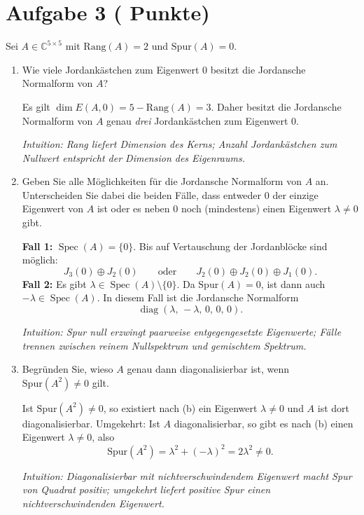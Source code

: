\documentclass[11pt, a4paper]{article}
\newcommand{\aufgabe}[2]{%
  \section*{\Large\bfseries Aufgabe #1%
  \if\relax\detokenize{#2}\relax\else \hfill\normalfont\normalsize(#2 Punkte)\fi}%
  \vspace{-1.5ex}
}
\begin{document}
\aufgabe{3}{}
Sei $A\in\mathbb{C}^{5\times 5}$ mit $\mathrm{Rang}(A)=2$ und $\mathrm{Spur}(A)=0$.
\begin{enumerate}
  \item Wie viele Jordankästchen zum Eigenwert $0$ besitzt die Jordansche Normalform von $A$?
  \begin{framed}
  Es gilt $\dim E(A,0)=5-\mathrm{Rang}(A)=3$. Daher besitzt die Jordansche
  Normalform von $A$ genau \emph{drei} Jordankästchen zum Eigenwert $0$.

  \medskip\noindent\textit{Intuition: Rang liefert Dimension des Kerns; Anzahl Jordankästchen zum Nullwert entspricht der Dimension des Eigenraums.}
  \end{framed}

  \item Geben Sie alle Möglichkeiten für die Jordansche Normalform von $A$ an. Unterscheiden Sie dabei die beiden Fälle, dass entweder $0$ der einzige Eigenwert von $A$ ist oder es neben $0$ noch (mindestens) einen Eigenwert $\lambda\neq 0$ gibt.
  \begin{framed}
  \textbf{Fall 1:} $\operatorname{Spec}(A)=\{0\}$. Bis auf Vertauschung der
  Jordanblöcke sind möglich:
  \[
    J_3(0)\oplus J_2(0)
    \qquad\text{oder}\qquad
    J_2(0)\oplus J_2(0)\oplus J_1(0).
  \]
  \textbf{Fall 2:} Es gibt $\lambda\in\operatorname{Spec}(A)\setminus\{0\}$.
  Da $\mathrm{Spur}(A)=0$, ist dann auch $-\lambda\in\operatorname{Spec}(A)$.
  In diesem Fall ist die Jordansche Normalform
  \[
    \operatorname{diag}(\lambda,\,-\lambda,\,0,\,0,\,0).
  \]

  \medskip\noindent\textit{Intuition: Spur null erzwingt paarweise entgegengesetzte Eigenwerte; Fälle trennen zwischen reinem Nullspektrum und gemischtem Spektrum.}
  \end{framed}

  \item Begründen Sie, wieso $A$ genau dann diagonalisierbar ist, wenn $\mathrm{Spur}(A^2)\neq 0$ gilt.
  \begin{framed}
  Ist $\mathrm{Spur}(A^2)\neq 0$, so existiert nach (b) ein Eigenwert
  $\lambda\neq 0$ und $A$ ist dort diagonalisierbar. Umgekehrt:
  Ist $A$ diagonalisierbar, so gibt es nach (b) einen Eigenwert $\lambda\neq 0$,
  also
  \[
    \mathrm{Spur}(A^2)=\lambda^2+(-\lambda)^2=2\lambda^2\neq 0.
  \]

  \medskip\noindent\textit{Intuition: Diagonalisierbar mit nichtverschwindendem Eigenwert macht Spur von Quadrat positiv; umgekehrt liefert positive Spur einen nichtverschwindenden Eigenwert.}
  \end{framed}
\end{enumerate}
\end{document}
